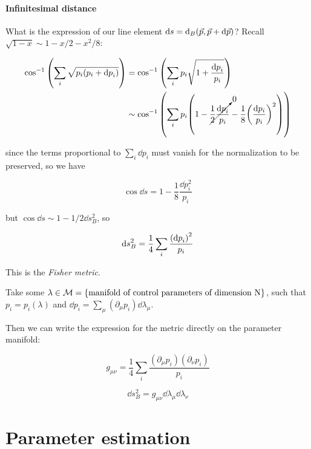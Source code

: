 \documentclass[main.tex]{subfiles}
\begin{document}
\paragraph{Infinitesimal distance}

What is the expression of our line element  \(\dd{s} =  \dd _{B} \qty(\vec{p} , \vec{p} + \dd{\vec{p}}) \)? Recall \(\sqrt{1-x} \sim 1 - x/2 -x^2/8\):

\begin{align}
  \cos ^{-1} \qty(\sum_i \sqrt{p_i(p_i + \dd{p}_i)})
  &= \cos ^{-1} \qty(\sum_i p_i \sqrt{1 + \frac{\dd{p}_i }{p_i}})  \\
  &\sim \cos ^{-1} \qty(\sum_i p_i \qty(1 - \cancelto{0}{\frac{1}{2} \frac{\dd{p}_i}{p_i}}
  - \frac{1}{8} \qty(\frac{\dd{p_i}}{p_i})^{2} ))
\end{align}

since the terms proportional to \( \sum_i \dd{p}_i \) must vanish for the normalization to be preserved, so we have

\begin{equation}
  \cos \dd{s} = 1 - \frac{1}{8}\frac{\dd{p}_i ^{2} }{p_i}
\end{equation}

but \( \cos \dd{s} \sim 1 - 1/2 \dd{s}^{2} _{B}  \), so

\begin{equation} \label{eq:fisher-metric}
  \dd{s}^{2}_{B}  = \frac{1}{4} \sum_i  \frac{\qty(\dd{p}_i)^{2} }{p_i}
\end{equation}

This is the \emph{Fisher metric}.

Take some \( \lambda \in \mathcal{M} = \qty{\text{manifold of control parameters of dimension N}} \), such that \( p_i = p_i(\lambda) \) and  \( \dd{p}_i = \sum_\mu (\partial_\mu p_i) \dd{\lambda_\mu} \).

Then we can write the expression for the metric directly on the parameter manifold:

\begin{equation}
  g _{\mu \nu} = \frac{1}{4} \sum_i \frac{(\partial_\mu p_i)(\partial_\nu p_i)}{p_i}
\end{equation}

\begin{equation}
  \dd{s}_B ^2 = g _{\mu \nu} \dd{\lambda}_\mu \dd{\lambda}_\nu
\end{equation}

\section{Parameter estimation}
\end{document}
